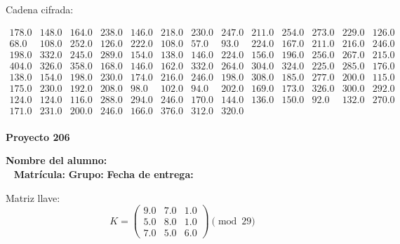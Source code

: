 \documentclass[12pt]{article}
\begin{document}
Cadena cifrada:
\begin{center}
$\begin{array}{lllllllllllll}
178.0 & 148.0 & 164.0 & 238.0 & 146.0 & 218.0 & 230.0 & 247.0 & 211.0 & 254.0 & 273.0 & 229.0 & 126.0\\
68.0 & 108.0 & 252.0 & 126.0 & 222.0 & 108.0 & 57.0 & 93.0 & 224.0 & 167.0 & 211.0 & 216.0 & 246.0\\
198.0 & 332.0 & 245.0 & 289.0 & 154.0 & 138.0 & 146.0 & 224.0 & 156.0 & 196.0 & 256.0 & 267.0 & 215.0\\
404.0 & 326.0 & 358.0 & 168.0 & 146.0 & 162.0 & 332.0 & 264.0 & 304.0 & 324.0 & 225.0 & 285.0 & 176.0\\
138.0 & 154.0 & 198.0 & 230.0 & 174.0 & 216.0 & 246.0 & 198.0 & 308.0 & 185.0 & 277.0 & 200.0 & 115.0\\
175.0 & 230.0 & 192.0 & 208.0 & 98.0 & 102.0 & 94.0 & 202.0 & 169.0 & 173.0 & 326.0 & 300.0 & 292.0\\
124.0 & 124.0 & 116.0 & 288.0 & 294.0 & 246.0 & 170.0 & 144.0 & 136.0 & 150.0 & 92.0 & 132.0 & 270.0\\
171.0 & 231.0 & 200.0 & 246.0 & 166.0 & 376.0 & 312.0 & 320.0\\
\end{array}$
\end{center}

\newpage


\textbf{Proyecto 206}

\textbf{Nombre del alumno:} \underline{\hspace{13cm}}\\\
\vspace{1cm}
\textbf{Matrícula:} \underline{\hspace{4cm}} \hspace{1cm}
\textbf{Grupo:} \underline{\hspace{2cm}}
\textbf{Fecha de entrega:} \underline{\hspace{2cm}}

\medskip

Matriz llave:
\[
K = \begin{pmatrix}
9.0 & 7.0 & 1.0\\
5.0 & 8.0 & 1.0\\
7.0 & 5.0 & 6.0
\end{pmatrix} \pmod{29}
\]
\end{document}
